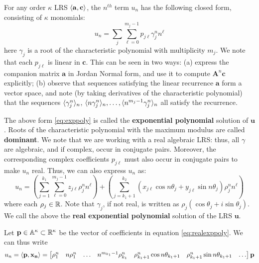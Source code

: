 For any order $\kappa$ LRS $\langle\mathbf{a}, \mathbf{c}\rangle$, the $n^{th}$ term $u_n$ has the following closed form, consisting of $\kappa$ monomials:
\begin{equation}
\label{eq:exppoly}
u_n = \sum_{j}\sum_{\ell=0}^{m_j - 1}p_{j\ell}\gamma_j^n n^\ell
\end{equation}
here $\gamma_j$ is a root of the characteristic polynomial with multiplicity $m_j$. We note that each $p_{j\ell}$ is linear in $\mathbf{c}$. This can be seen in two ways: (a) express the companion matrix $\mathbf{a}$ in Jordan Normal form, and use it to compute $\mathbf{A}^n\mathbf{c}$ explicitly; (b) observe that sequences satisfying the linear recurrence $\mathbf{a}$ form a vector space, and note (by taking derivatives of the characteristic polynomial) that the sequences $\langle\gamma_j^n\rangle_n$, $\langle n\gamma_j^n\rangle_n, \dots, \langle n^{m_j-1}\gamma_j^n\rangle_n$ all satisfy the recurrence. 

The above form \ref{eq:exppoly} is called the \textbf{exponential polynomial} solution of $\mathbf{u}$. Roots of the characteristic polynomial with the maximum modulus are called \textbf{dominant}. We note that we are working with a real algebraic LRS: thus, all $\gamma$ are algebraic, and if complex, occur in conjugate pairs. Moreover, the corresponding complex coefficients $p_{j\ell}$ must also occur in conjugate pairs to make $u_n$ real. Thus, we can also express $u_n$ as:
\begin{equation}
\label{eq:realexppoly}
u_n = \left(\sum_{j=1}^{k_1}\sum_{\ell = 0}^{m_j-1} z_{j\ell}\rho_j^n n^\ell\right) + \left(\sum_{j=k_1 + 1}^{k_2}  (x_{j\ell} \cos n\theta_j + y_{j\ell}\sin n\theta_j)\rho_j^n n^\ell\right)
\end{equation}
where each $\rho_j \in \mathbb{R}$. Note that $\gamma_j$, if not real, is written as $\rho_j(\cos \theta_j + i\sin \theta_j)$. We call the above the \textbf{real exponential polynomial} solution of the LRS $\mathbf{u}$. 

Let $\mathbf{p} \in \mathbb{A}^{\kappa} \subset \mathbb{R}^\kappa$ be the vector of coefficients in equation \ref{eq:realexppoly}. We can thus write
\begin{equation}
\label{eq:innerprod}
u_n = \langle\mathbf{p}, \mathbf{x_n}\rangle= 
\begin{bmatrix}
\rho_1^n & n \rho_1^n & \dots & n^{m_{k_1}-1}\rho_{k_1}^n & \rho_{k_1+1}^n\cos n\theta_{k_1+1} & \rho_{k_1+1}^n\sin n\theta_{k_1+1} & \dots
\end{bmatrix}\mathbf{p}
\end{equation}

